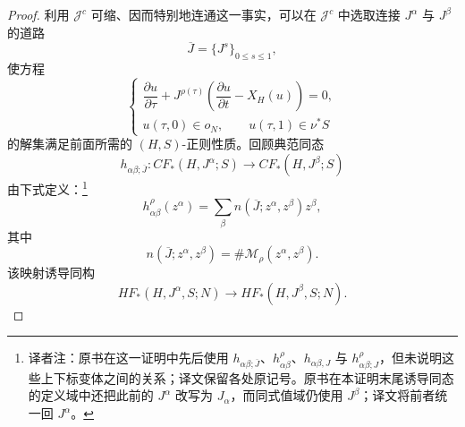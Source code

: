 \begin{proof}
利用 $\mathcal J^c$ 可缩、因而特别地连通这一事实，可以在 $\mathcal J^c$ 中选取连接 $J^\alpha$ 与 $J^\beta$ 的道路
\[
  \overline J=\{J^s\}_{0\le s\le1},
\]
使方程
\begin{equation}
  \begin{cases}
    \dfrac{\partial u}{\partial\tau}
    +J^{\rho(\tau)}\left(
      \dfrac{\partial u}{\partial t}-X_H(u)
    \right)=0,\\[6pt]
    u(\tau,0)\in o_N,
    \qquad u(\tau,1)\in\nu^*S
  \end{cases}
\label{eq:continuation-varying-j-only}
\end{equation}
的解集满足前面所需的 $(H,S)$-正则性质。回顾典范同态
\[
  h_{\alpha\beta;\overline J}:
  CF_*(H,J^\alpha;S)
  \longrightarrow CF_*(H,J^\beta;S)
\]
由下式定义：\footnote{译者注：原书在这一证明中先后使用 $h_{\alpha\beta;\overline J}$、$h_{\alpha\beta}^{\rho}$、$h_{\alpha\beta,J}$ 与 $h_{\alpha\beta;J}^{\rho}$，但未说明这些上下标变体之间的关系；译文保留各处原记号。原书在本证明末尾诱导同态的定义域中还把此前的 $J^\alpha$ 改写为 $J_\alpha$，而同式值域仍使用 $J^\beta$；译文将前者统一回 $J^\alpha$。}
\[
  h_{\alpha\beta}^{\rho}(z^\alpha)
  =\sum_\beta n(\overline J;z^\alpha,z^\beta)z^\beta,
\]
其中
\[
  n(\overline J;z^\alpha,z^\beta)
  =\#\mathcal M_\rho(z^\alpha,z^\beta).
\]
该映射诱导同构
\[
  HF_*(H,J^\alpha,S;N)
  \longrightarrow HF_*(H,J^\beta,S;N).
\]


\end{proof}
